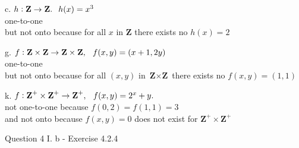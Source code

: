 \documentclass[OPONE]{example}
\begin{document}
\begin{list}{}{}

	\item{c.}
	$h: \textbf{Z}\rightarrow\textbf{Z}. \hspace{.1 in} h(x) = x^{3}$ \\
	 one-to-one \\
	 but not onto because for all $x$ in $\textbf{Z}$ there exists no $h(x) = 2$

	\item{g.}
	$f: \textbf{Z} \times \textbf{Z}\rightarrow \textbf{Z} \times \textbf{Z}, \hspace{.1 in} f(x, y) = (x+1, 2y)$ \\
	one-to-one \\
	but not onto because for all $(x,y)$ in $\textbf{Z}\times\textbf{Z}$ there exists no $f(x,y) = (1,1)$ 

	\item{k.}
	$f: \textbf{Z}^{+} \times \textbf{Z}^{+} \rightarrow \textbf{Z}^{+}, \hspace{.1 in}  f(x, y) = 2^{x} + y.$ \\
	not one-to-one because $f(0,2) = f(1,1) = 3$ \\
	and not onto because $f(x,y) = 0$ does not exist for $\textbf{Z}^{+} \times \textbf{Z}^{+} $

\end{list}


\noindent Question 4 I. b - Exercise 4.2.4
\end{document}
